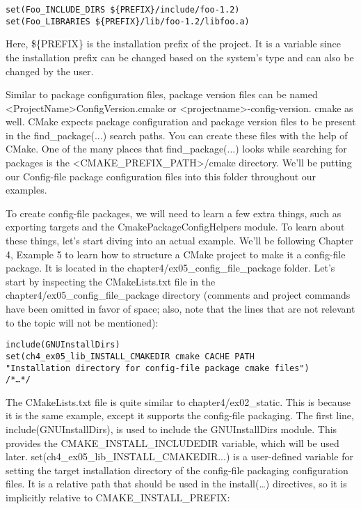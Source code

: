 \begin{lstlisting}[style=styleCMake]
set(Foo_INCLUDE_DIRS ${PREFIX}/include/foo-1.2)
set(Foo_LIBRARIES ${PREFIX}/lib/foo-1.2/libfoo.a)
\end{lstlisting}

Here, \$\{PREFIX\} is the installation prefix of the project. It is a variable since the installation prefix can be changed based on the system's type and can also be changed by the user.

Similar to package configuration files, package version files can be named <ProjectName>ConfigVersion.cmake or <projectname>-config-version. cmake as well. CMake expects package configuration and package version files to be present in the find\_package(...) search paths. You can create these files with the help of CMake. One of the many places that find\_package(...) looks while searching for packages is the <CMAKE\_PREFIX\_PATH>/cmake directory. We'll be putting our Config-file package configuration files into this folder throughout our examples.

To create config-file packages, we will need to learn a few extra things, such as exporting targets and the CmakePackageConfigHelpers module. To learn about these things, let's start diving into an actual example. We'll be following Chapter 4, Example 5 to learn how to structure a CMake project to make it a config-file package. It is located in the chapter4/ex05\_config\_file\_package folder. Let's start by inspecting the CMakeLists.txt file in the chapter4/ex05\_config\_file\_package directory (comments and project commands have been omitted in favor of space; also, note that the lines that are not relevant to the topic will not be mentioned):

\begin{lstlisting}[style=styleCMake]
include(GNUInstallDirs)
set(ch4_ex05_lib_INSTALL_CMAKEDIR cmake CACHE PATH
"Installation directory for config-file package cmake files")
/*…*/
\end{lstlisting}

The CMakeLists.txt file is quite similar to chapter4/ex02\_static. This is because it is the same example, except it supports the config-file packaging. The first line, include(GNUInstallDirs), is used to include the GNUInstallDirs module. This provides the CMAKE\_INSTALL\_INCLUDEDIR variable, which will be used later. set(ch4\_ex05\_lib\_INSTALL\_CMAKEDIR...) is a user-defined variable for setting the target installation directory of the config-file packaging configuration files. It is a relative path that should be used in the install(…) directives, so it is implicitly relative to CMAKE\_INSTALL\_PREFIX:


